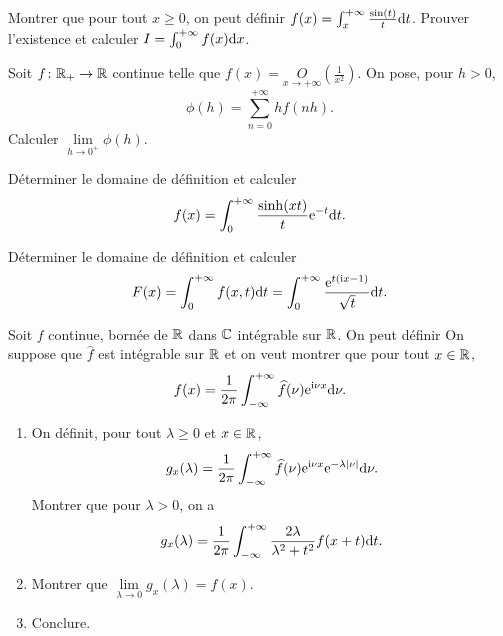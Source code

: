 \begin{exercise}
    Montrer que pour tout $x\geqslant0$, on peut définir $f(x)=\int_{x}^{+\infty}\frac{\sin(t)}{t}\mathrm{d} t$. Prouver l'existence et calculer $I=\int_{0}^{+\infty}f(x)\mathrm{d} x$.
\end{exercise}

\begin{exercise}
    Soit $f\colon\mathbb{R}_{+}\to\mathbb{R}$ continue telle que $f(x)=\underset{x\to+\infty}{O}\left(\frac{1}{x^{2}}\right)$. On pose, pour $h>0$, 
    \begin{equation}
        \phi(h)=\sum_{n=0}^{+\infty}hf(nh).
    \end{equation}
    Calculer $\lim\limits_{h\to0^{+}}\phi(h)$.
\end{exercise}

\begin{exercise}
    Déterminer le domaine de définition et calculer 
    \begin{equation}
        f(x)=\int_{0}^{+\infty}\frac{\sinh(xt)}{t}\mathrm{e}^{-t}\mathrm{d} t.
    \end{equation}
\end{exercise}

\begin{exercise}
    Déterminer le domaine de définition et calculer 
    \begin{equation}
        F(x)=\int_{0}^{+\infty}f(x,t)\mathrm{d} t=\int_{0}^{+\infty}\frac{\mathrm{e}^{t(\mathrm{i} x-1)}}{\sqrt{t}}\mathrm{d} t.
    \end{equation}
\end{exercise}

\begin{exercise}
    Soit $f$ continue, bornée de $\mathbb{R}$ dans $\mathbb{C}$ intégrable sur $\mathbb{R}$. On peut définir 
    On suppose que $\widehat{f}$ est intégrable sur $\mathbb{R}$ et on veut montrer que pour tout $x\in\mathbb{R}$,
    \begin{equation}
        f(x)=\frac{1}{2\pi}\int_{-\infty}^{+\infty}\widehat{f}(\nu)\mathrm{e}^{\mathrm{i}\nu x}\mathrm{d}\nu.
    \end{equation}

    \begin{enumerate}
        \item On définit, pour tout $\lambda\geqslant0$ et $x\in\mathbb{R}$,
        \begin{equation}
            g_x(\lambda)=\frac{1}{2\pi}\int_{-\infty}^{+\infty}\widehat{f}(\nu)\mathrm{e}^{\mathrm{i}\nu x}\mathrm{e}^{-\lambda\left\lvert \nu\right\rvert}\mathrm{d}\nu.
        \end{equation}
        Montrer que pour $\lambda>0$, on a 
        \begin{equation}
            g_x(\lambda)=\frac{1}{2\pi}\int_{-\infty}^{+\infty}\frac{2\lambda}{\lambda^{2}+t^{2}}f(x+t)\mathrm{d} t.
        \end{equation}
        \item Montrer que $\lim\limits_{\lambda\to0}g_x(\lambda)=f(x)$.
        \item Conclure.
    \end{enumerate}
\end{exercise}

